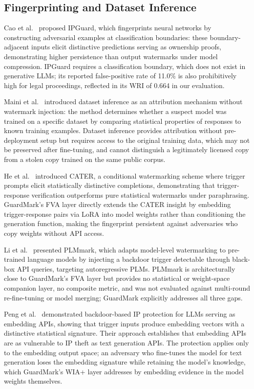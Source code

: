 \documentclass[journal,compsoc]{IEEEtran}
\begin{document}
\subsection{Fingerprinting and Dataset Inference}

Cao et al.~\cite{cao2021ipguard} proposed IPGuard, which fingerprints neural
networks by constructing adversarial examples at classification boundaries:
these boundary-adjacent inputs elicit distinctive predictions serving as
ownership proofs, demonstrating higher persistence than output watermarks under
model compression. IPGuard requires a classification boundary, which does not
exist in generative LLMs; its reported false-positive rate of 11.0\% is also
prohibitively high for legal proceedings, reflected in its WRI of 0.664 in
our evaluation.

Maini et al.~\cite{maini2021dataset} introduced dataset inference as an
attribution mechanism without watermark injection: the method determines whether
a suspect model was trained on a specific dataset by comparing statistical
properties of responses to known training examples. Dataset inference provides
attribution without pre-deployment setup but requires access to the original
training data, which may not be preserved after fine-tuning, and cannot
distinguish a legitimately licensed copy from a stolen copy trained on the same
public corpus.

He et al.~\cite{he2022cater} introduced CATER, a conditional watermarking
scheme where trigger prompts elicit statistically distinctive completions,
demonstrating that trigger-response verification outperforms pure statistical
watermarks under paraphrasing. GuardMark's FVA layer directly extends the
CATER insight by embedding trigger-response pairs via LoRA into model weights
rather than conditioning the generation function, making the fingerprint
persistent against adversaries who copy weights without API access.

Li et al.~\cite{li2023plmmark} presented PLMmark, which adapts model-level
watermarking to pre-trained language models by injecting a backdoor trigger
detectable through black-box API queries, targeting autoregressive PLMs.
PLMmark is architecturally close to GuardMark's FVA layer but provides no
statistical or weight-space companion layer, no composite metric, and was not
evaluated against multi-round re-fine-tuning or model merging; GuardMark
explicitly addresses all three gaps.

Peng et al.~\cite{peng2023are} demonstrated backdoor-based IP protection for
LLMs serving as embedding APIs, showing that trigger inputs produce embedding
vectors with a distinctive statistical signature. Their approach establishes
that embedding APIs are as vulnerable to IP theft as text generation APIs.
The protection applies only to the embedding output space; an adversary who
fine-tunes the model for text generation loses the embedding signature while
retaining the model's knowledge, which GuardMark's WIA+ layer addresses by
embedding evidence in the model weights themselves.
\end{document}
